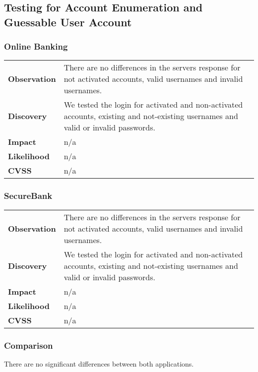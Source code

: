 \subsection{Testing for Account Enumeration and Guessable User Account}

\subsubsection*{Online Banking}

\begin{tabular}{l|p{10cm}}

\textbf{Observation} & There are no differences in the servers response for not activated accounts, valid usernames and invalid usernames.  \\
\textbf{Discovery} & We tested the login for activated and non-activated accounts, existing and not-existing usernames and valid or invalid passwords. \\
\textbf{Impact} & n/a \\
\textbf{Likelihood} & n/a \\
\textbf{CVSS} & n/a \\
\end{tabular}

\subsubsection*{SecureBank}

\begin{tabular}{l|p{10cm}}

\textbf{Observation} & There are no differences in the servers response for not activated accounts, valid usernames and invalid usernames.  \\
\textbf{Discovery} & We tested the login for activated and non-activated accounts, existing and not-existing usernames and valid or invalid passwords. \\
\textbf{Impact} & n/a \\
\textbf{Likelihood} & n/a \\
\textbf{CVSS} & n/a \\
\end{tabular}

\subsubsection*{Comparison}
There are no significant differences between both applications.

\clearpage


